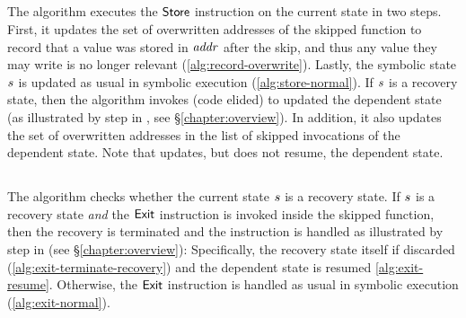 \subsection{}

The algorithm executes the $\mathsf{Store}$ instruction on the
current state in two steps. First, it updates the set of overwritten
addresses of the skipped function to record that a value was stored in
$\mathit{addr}$ after the skip, and thus any value they may write is no longer
relevant (\cref{alg:record-overwrite}). Lastly, the symbolic state
$s$ is updated as usual in symbolic execution
(\cref{alg:store-normal}). If $s$ is a recovery state, then
the algorithm invokes
 (code elided) to
updated the dependent state (as illustrated by step  in
, see \S\ref{chapter:overview}). In addition, it also
updates the set of overwritten addresses in the list of skipped
invocations of the dependent state. Note that
 updates, but
does not resume, the dependent state.

\subsection{}

The algorithm checks whether the current state $s$ is a
recovery state. If $s$ is a recovery state \emph{and} the
$\mathsf{Exit}$ instruction is invoked inside the skipped function,
then the recovery is terminated and the instruction is handled as
illustrated by step  in  (see
\S\ref{chapter:overview}): Specifically, the recovery state itself if
discarded (\cref{alg:exit-terminate-recovery}) and the dependent state
is resumed \cref{alg:exit-resume}. Otherwise, the $\mathsf{Exit}$
instruction is handled as usual in symbolic execution
(\cref{alg:exit-normal}).


